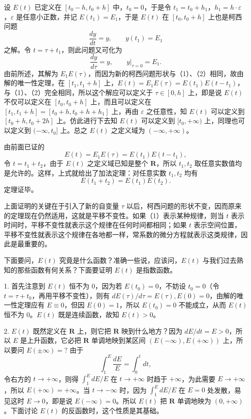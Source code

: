 设 $E(t)$ 已定义在 $[t_0-h,t_0+h]$ 中，$t_0=0$，于是令 $t_1=t_0+h_1$，$h_1=h\cdot\varepsilon$，$\varepsilon$ 是任意小正数，并记 $E(t_1)=E_1$，于是 $E(t)$ 在 $[t_0,t_0+h]$ 上也是柯西问题
\[
\frac{dy}{dt}=y,\qquad y(t_1)=E_1
\]
之解。令 $t=\tau+t_1$，则此问题又可化为
\[
\frac{dy}{d\tau}=y,\qquad y\big|_{\tau=0}=E_1.
\]
由前所述，其解为 $E_1E(\tau)$，而因为新的柯西问题形状与（1）、（2）相同，故由解的唯一性定理，在 $[t_1,t_1+h]$ 上，$E(t)=E_1E(\tau)=E(t_1)E(t-t_1)$，与（1）、（2）完全相同，所以这个解应可以定义于 $\tau\in[0,h]$ 上，即是说 $E(t)$ 不仅可以定义在 $[t_0,t_0+h]$ 上，而且可以定义在 $[t_1,t_1+h]=[t_0+h,t_0+h+h_1]$ 上，再由 $\varepsilon$ 之任意性，知 $E(t)$ 可以定义到 $[t_0+h,t_0+2h]$ 上。仿此进行下去知 $E(t)$ 可以定义到 $[t_0,+\infty)$ 上，同理也可以定义到 $(-\infty,t_0]$ 上。总之 $E(t)$ 之定义域为 $(-\infty,+\infty)$。

由前面已证的
\[
E(t)=E_1E(\tau)=E(t_1)E(t-t_1),
\]
令 $t=t_1+t_2$，由于 $E(t)$ 之定义域已知是整个 $\mathbf R$，所以 $t_1,t_2$ 取任意实数值均是允许的。这样，上式就给出了加法定理：对任意实数 $t_1,t_2$ 均有
\[
E(t_1+t_2)=E(t_1)E(t_2).
\]
定理证毕。

上面证明的关键在于引入了新的自变量 $\tau$ 以后，柯西问题的形状不变，因而原来的定理现在仍然适用，这就是平移不变性。如果（1）表示某种规律，则当 $t$ 表示时间时，平移不变性就表示这个规律在任何时间都相同；如果 $t$ 表示空间位置，平移不变性就表示这个规律在各地都一样，常系数的微分方程就表示这类规律，因此是最重要的。

下面要问，$E(t)$ 究竟是什么函数？准确一些说，应该问，$E(t)$ 与我们过去熟知的那些函数有何关系？下面要证明 $E(t)$ 是指数函数。

1. 首先注意到 $E(t)$ 恒不为 $0$，因为若 $E(t_0)=0$，不妨设 $t_0=0$（令 $t=\tau+t_0$，再用平移不变性），则有 $dE(\tau)/d\tau=E(\tau),E(0)=0$，由解的唯一性定理应有 $E\equiv0$，但因 $E(0)=1$，所以 $E(t_0)=0$ 不能成立，从而 $E(t)$ 恒不为 $0$。$E(t)$ 既是连续函数，故知 $E(t)>0$。

2. $E(t)$ 既然定义在 $\mathbf R$ 上，则它把 $\mathbf R$ 映到什么地方？因为 $dE/dt=E>0$，所以 $E$ 是上升函数，它必把 $\mathbf R$ 单调地映到某区间 $(E(-\infty),E(+\infty))$ 上，所以要问 $E(\pm\infty)=?$ 由于
\[
\int_1^E\frac{dE}{E}=\int_0^t dt,
\]
令右方的 $t\to+\infty$，则得 $\int_1^E dE/E$ 在 $t\to+\infty$ 时趋于 $+\infty$，为此需要 $E\to+\infty$，所以 $E(+\infty)=+\infty$。当 $t\to-\infty$ 时，因为 $\int_1^E dE/E$ 在 $E=0$ 处发散，易见这时 $E\to0$，即是说 $E(-\infty)=0$。所以 $E(t)$ 把 $\mathbf R$ 单调地映为 $(0,+\infty)$。下面讨论 $E(t)$ 的反函数时，这个性质是其基础。


